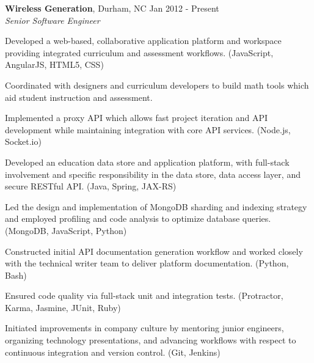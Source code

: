\documentclass[margin,line]{resume}
\begin{document}
\begin{resume}
  \textbf{Wireless Generation}, Durham, NC \hfill Jan 2012 - Present\vspace{1mm}\\
  \textsl{Senior Software Engineer}\\
  \vspace{-3mm}
  \begin{list2}
\item Developed a web-based, collaborative application platform and workspace providing
  integrated curriculum and assessment workflows. (JavaScript, AngularJS, HTML5, CSS)
\item Coordinated with designers and curriculum developers to build math tools which
  aid student instruction and assessment.
\item Implemented a proxy API which allows fast project iteration and API development
  while maintaining integration with core API services. (Node.js, Socket.io)
\item Developed an education data store and application platform, with full-stack
  involvement and specific responsibility in the data store, data access layer,
  and secure RESTful API. (Java, Spring, JAX-RS)
\item Led the design and implementation of MongoDB sharding and indexing strategy
  and employed profiling and code analysis to optimize database queries. (MongoDB,
  JavaScript, Python)
\item Constructed initial API documentation generation workflow and worked closely
  with the technical writer team to deliver platform documentation. (Python,
  Bash)
\item Ensured code quality via full-stack unit and integration tests. (Protractor,
  Karma, Jasmine, JUnit, Ruby)
\item Initiated improvements in company culture by mentoring junior engineers,
  organizing technology presentations, and advancing workflows with respect to
  continuous integration and version control. (Git, Jenkins)
  \end{list2}


\end{resume}
\end{document}
